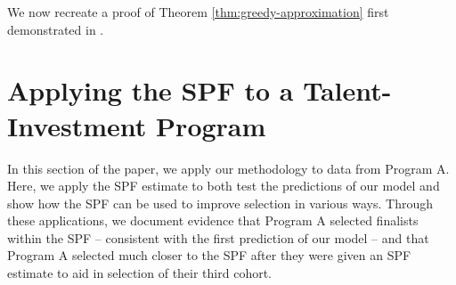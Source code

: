 We now recreate a proof of Theorem \ref{thm:greedy-approximation} first demonstrated in \cite{nemhauser1978analysis}.







\section{Applying the SPF to a Talent-Investment Program}\label{sec:case}

In this section of the paper, we apply our methodology to data from Program A. Here, we apply the SPF estimate to both test the predictions of our model and show how the SPF can be used to improve selection in various ways. Through these applications, we document evidence that Program A selected finalists within the SPF -- consistent with the first prediction of our model -- and that Program A selected much closer to the SPF after they were given an SPF estimate to aid in selection of their third cohort.

